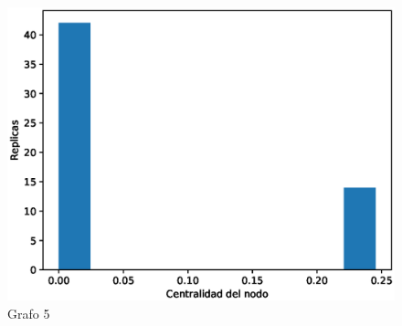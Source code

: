 \documentclass{article}
\begin{document}
\begin{figure}[H]
    \includegraphics[scale=0.6]{hist-cercania-5}
    \caption{Grafo 5}
    \label{fig:matriz}
\end{figure}
\end{document}
